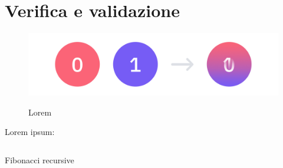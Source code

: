 \chapter{Verifica e validazione}
\label{chap:verifica-validazione}

\begin{figure}[H]
    \centering
    \includegraphics[alt={Testo alternativo dell'immagine}, width=1\columnwidth]{img/quantum_superposition.jpeg}
    \caption{Lorem}
    \label{fig:enter-label}
\end{figure}

\lipsum[1-2]
Lorem ipsum:
\begin{listing}[H]
\inputminted{python}{code/example.py}
\caption{Fibonacci recursive}
\label{listing:py_fibo}
\end{listing}

\lipsum[1]

\newpage